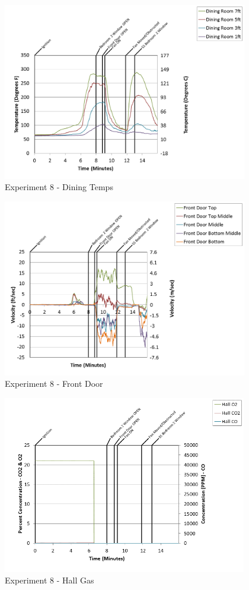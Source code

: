 \documentclass{article}
\begin{document}
\begin{appendices}
\begin{figure}[h!]
	\centering
	\includegraphics[height=3.05in]{0_Images/Results_Charts/Exp_8_Charts/DiningTemps.png}
	\caption{Experiment 8 - Dining Temps}
\end{figure}

\clearpage

\begin{figure}[h!]
	\centering
	\includegraphics[height=3.05in]{0_Images/Results_Charts/Exp_8_Charts/FrontDoor.png}
	\caption{Experiment 8 - Front Door}
\end{figure}


\begin{figure}[h!]
	\centering
	\includegraphics[height=3.05in]{0_Images/Results_Charts/Exp_8_Charts/HallGas.png}
	\caption{Experiment 8 - Hall Gas}
\end{figure}


\end{appendices}
\end{document}
